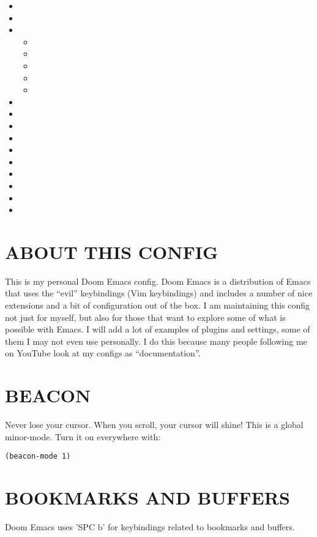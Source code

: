 \documentclass[11pt]{article}
\begin{document}
\begin{itemize}
\item 
\item 
\item \begin{itemize}
\item 
\item 
\item 
\item 
\item 
\end{itemize}
\item 
\item 
\item 
\item 
\item 
\item 
\item 
\item 
\item 
\item 
\end{itemize}

\section{ABOUT THIS CONFIG}
\label{sec:org9e5bfba}
This is my personal Doom Emacs config.  Doom Emacs is a distribution of Emacs that uses the ``evil'' keybindings (Vim keybindings) and includes a number of nice extensions and a bit of configuration out of the box.  I am maintaining this config not just for myself, but also for those that want to explore some of what is possible with Emacs.  I will add a lot of examples of plugins and settings, some of them I may not even use personally.  I do this because many people following me on YouTube look at my configs as ``documentation''.

\section{BEACON}
\label{sec:org6e797ec}
Never lose your cursor.  When you scroll, your cursor will shine!  This is a global minor-mode. Turn it on everywhere with:

\begin{verbatim}
(beacon-mode 1)
\end{verbatim}

\section{BOOKMARKS AND BUFFERS}
\label{sec:orga0d0630}
Doom Emacs uses 'SPC b' for keybindings related to bookmarks and buffers.
\end{document}
